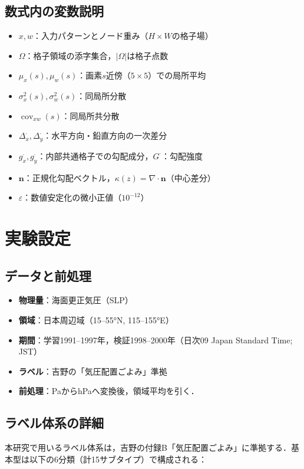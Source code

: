 \documentclass{jarticle}
\theoremstyle{definition}
\begin{document}
\subsection*{数式内の変数説明}
\begin{itemize}
\item $x,w$：入力パターンとノード重み（$H\times W$の格子場）
\item $\Omega$：格子領域の添字集合，$|\Omega|$は格子点数
\item $\mu_x(s),\mu_w(s)$：画素$s$近傍（$5\times 5$）での局所平均
\item $\sigma_x^2(s),\sigma_w^2(s)$：同局所分散
\item $\operatorname{cov}_{xw}(s)$：同局所共分散
\item $\Delta_x^\cdot,\Delta_y^\cdot$：水平方向・鉛直方向の一次差分
\item $g_x^\cdot,g_y^\cdot$：内部共通格子での勾配成分，$G^\cdot$：勾配強度
\item $\bm{n}$：正規化勾配ベクトル，$\kappa(z)=\nabla\cdot\bm{n}$（中心差分）
\item $\varepsilon$：数値安定化の微小正値（$10^{-12}$）
\end{itemize}

\section{実験設定}
\subsection{データと前処理}
\begin{itemize}
\item \textbf{物理量}：海面更正気圧（SLP）
\item \textbf{領域}：日本周辺域（15–55°N, 115–155°E）
\item \textbf{期間}：学習1991–1997年，検証1998–2000年（日次09 Japan Standard Time; JST）
\item \textbf{ラベル}：吉野\cite{吉野2002日本の気候}の「気圧配置ごよみ」準拠
\item \textbf{前処理}：PaからhPaへ変換後，領域平均を引く．
\end{itemize}

\subsection{ラベル体系の詳細}
本研究で用いるラベル体系は，吉野\cite{吉野2002日本の気候}の付録B「気圧配置ごよみ」に準拠する．基本型は以下の6分類（計15サブタイプ）で構成される：
\end{document}
